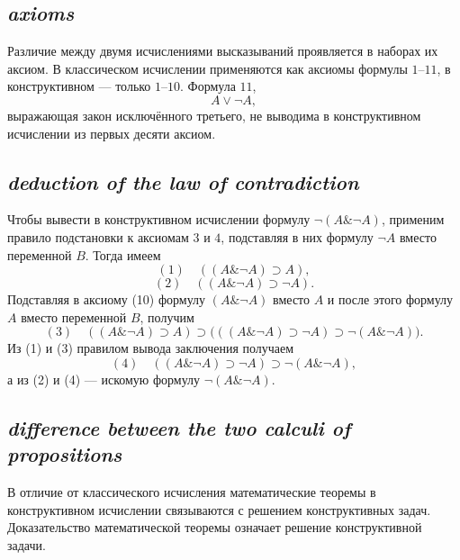 \subsection*{ \textit{axioms}}
\begin{rusblock}
Различие между двумя исчислениями высказываний проявляется в наборах их аксиом. В классическом исчислении применяются как аксиомы формулы $1$--$11$, в конструктивном --- только $1$--$10$. Формула $11$,
\[
A\vee\neg A,
\]
выражающая закон исключённого третьего, не выводима в конструктивном исчислении из первых десяти аксиом.
\end{rusblock}

\subsection*{ \textit{deduction of the law of contradiction}}
\begin{rusblock}
Чтобы вывести в конструктивном исчислении формулу $\neg(A\&\neg A)$, применим правило подстановки к аксиомам $3$ и $4$, подставляя в них формулу $\neg A$ вместо переменной $B$. Тогда имеем
\[
(1)\quad ((A\&\neg A)\supset A),
\]
\[
(2)\quad ((A\&\neg A)\supset\neg A).
\]
Подставляя в аксиому (10) формулу $(A\&\neg A)$ вместо $A$ и после этого формулу $A$ вместо переменной $B$, получим
\[
(3)\quad ((A\&\neg A)\supset A)\supset
\bigl(((A\&\neg A)\supset\neg A)\supset\neg(A\&\neg A)\bigr).
\]
Из (1) и (3) правилом вывода заключения получаем
\[
(4)\quad ((A\&\neg A)\supset\neg A)\supset\neg(A\&\neg A),
\]
а из (2) и (4) --- искомую формулу $\neg(A\&\neg A)$.
\end{rusblock}

\subsection*{ \textit{difference between the two calculi of propositions}}
\begin{rusblock}
В отличие от классического исчисления математические теоремы в конструктивном исчислении связываются с решением конструктивных задач. Доказательство математической теоремы означает решение конструктивной задачи.
\end{rusblock}

